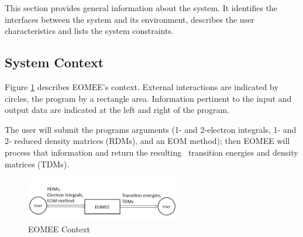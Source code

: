 \documentclass[12pt]{article}
\begin{document}
This section provides general information about the system.  It identifies the
interfaces between the system and its environment, describes the user
characteristics and lists the system constraints. 
%

\subsection{System Context}


Figure \ref{Fig_SystemContext} describes EOMEE's context. 
External interactions are indicated by circles, the program by a rectangle 
area. Information pertinent to the input and output data are indicated at the 
left and right of the program.

\noindent The user will submit the programs arguments (1- and 2-electron 
integrals, 1- and 2- reduced density matrices (RDMs), and an EOM 
method); then EOMEE will process that information and return the resulting 
transition energies and density matrices (TDMs). 

\begin{figure}[h!]
	\begin{center}
		\includegraphics[width=0.6\textwidth]{systemcontext}
		\caption{EOMEE Context}
		\label{Fig_SystemContext} 
	\end{center}
\end{figure}
\end{document}
